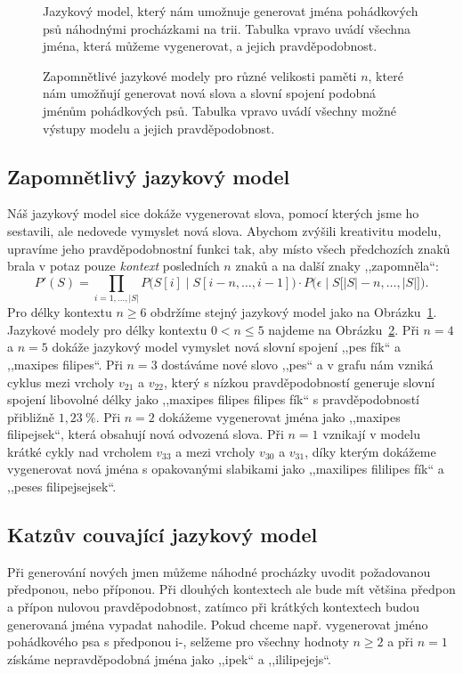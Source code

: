 \documentclass{csbulletin}
\begin{document}
\begin{figure}
\centering
\relax
\caption{Jazykový model, který nám umožnuje generovat jména pohádkových psů náhodnými procházkami na trii. Tabulka vpravo uvádí všechna jména, která můžeme vygenerovat, a jejich pravděpodobnost.}
\label{fig:language-model-6}
\end{figure}

\begin{figure}[p]
\centering

\caption{Zapomnětlivé jazykové modely pro různé velikosti paměti $n$, které nám umožňují generovat nová slova a slovní spojení podobná jménům pohádkových psů. Tabulka vpravo uvádí všechny možné výstupy modelu a jejich pravděpodobnost.}
\label{fig:language-model-5-1}
\end{figure}

\subsection{Zapomnětlivý jazykový model}
Náš jazykový model sice dokáže vygenerovat slova, pomocí kterých jsme ho sestavili, ale nedovede vymyslet nová slova. Abychom zvýšili kreativitu modelu, upravíme jeho pravděpodobnostní funkci tak, aby místo všech předchozích znaků brala v potaz pouze \emph{kontext} posledních $n$ znaků a na další znaky ,,zapomněla``:
\begin{equation}
P'(S) = \prod_{i = 1,\ldots,|S|} P\big(S[i]\mid S[i-n, \ldots, i-1]\big)\cdot P\big(\epsilon\mid S\big[|S|-n, \ldots, |S|\big]\big).
\end{equation}
Pro délky kontextu $n\geq 6$ obdržíme stejný jazykový model jako na Obrázku~\ref{fig:language-model-6}. Jazykové modely pro délky kontextu $0<n\leq 5$ najdeme na Obrázku~\ref{fig:language-model-5-1}. Při $n=4$ a $n=5$ dokáže jazykový model vymyslet nová slovní spojení ,,pes fík`` a ,,maxipes filipes``. Při $n=3$ dostáváme nové slovo ,,pes`` a v grafu nám vzniká cyklus mezi vrcholy $v_{21}$ a $v_{22}$, který s nízkou pravděpodobností generuje slovní spojení libovolné délky jako ,,maxipes filipes filipes fík`` s pravděpodobností přibližně $1{,}23\ \%$. Při $n=2$ dokážeme vygenerovat jména jako ,,maxipes filipejsek``, která obsahují nová odvozená slova. Při $n=1$ vznikají v modelu krátké cykly nad vrcholem $v_{33}$ a mezi vrcholy $v_{30}$ a $v_{31}$, díky kterým dokážeme vygenerovat nová jména s opakovanými slabikami jako ,,maxilipes fililipes fík`` a ,,peses filipejsejsek``.

\subsection{Katzův couvající jazykový model}
Při generování nových jmen můžeme náhodné procházky uvodit požadovanou předponou, nebo příponou. Při dlouhých kontextech ale bude mít většina předpon a přípon nulovou pravděpodobnost, zatímco při krátkých kontextech budou generovaná jména vypadat nahodile. Pokud chceme např. vygenerovat jméno pohádkového psa s předponou i-, selžeme pro všechny hodnoty $n\geq 2$ a při $n=1$ získáme nepravděpodobná jména jako ,,ipek`` a ,,ililipejejs``.
\end{document}
